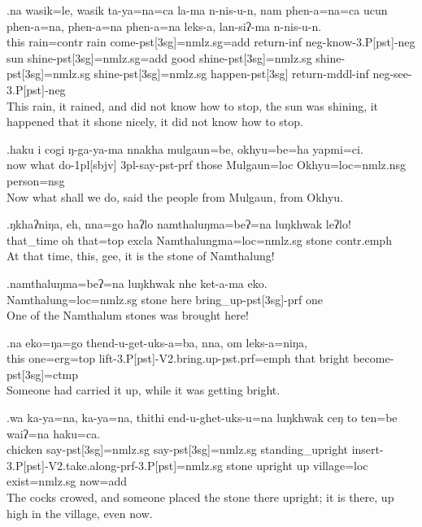 \exg.na wasik=le,  wasik ta-ya=na=ca   la-ma  n-nis-u-n, nam phen-a=na=ca   ucun phen-a=na,    phen-a=na    phen-a=na    leks-a, lan-siʔ-ma    n-nis-u-n.\\
this rain{\sc =contr} rain  come{\sc -pst[3sg]=nmlz.sg=add} return{\sc -inf} {\sc neg-}know{\sc -3.P[pst]-neg} sun shine{\sc -pst[3sg]=nmlz.sg=add} good shine{\sc -pst[3sg]=nmlz.sg} shine{\sc -pst[3sg]=nmlz.sg} shine{\sc -pst[3sg]=nmlz.sg} happen{\sc -pst[3sg]} return{\sc -mddl-inf} {\sc neg-}see{\sc -3.P[pst]-neg}\\
This rain, it rained, and did not know how to stop,  the sun was shining, it happened that it shone nicely,  it did not know how to stop.


\exg.haku i  cogi  ŋ-ga-ya-ma   nnakha mulgaun=be, okhyu=be=ha  yapmi=ci.\\
now  what do{\sc -1pl[sbjv]} {\sc 3pl-}say{\sc -pst-prf} those  Mulgaun{\sc =loc} Okhyu{\sc =loc=nmlz.nsg} person{\sc =nsg}\\
Now what shall we do, said the people from Mulgaun, from Okhyu.

\exg.ŋkhaʔniŋa, eh,  nna=go  haʔlo namthaluŋma=beʔ=na  luŋkhwak leʔlo!\\
that\_time oh that{\sc =top} excla  Namthalungma{\sc =loc=nmlz.sg} stone {\sc contr.emph}\\
At that time, this, gee, it is the stone of Namthalung!

\exg.namthaluŋma=beʔ=na  luŋkhwak nhe  ket-a-ma    eko.\\
Namthalung{\sc =loc=nmlz.sg} stone here bring\_up{\sc -pst[3sg]-prf} one\\
One of the Namthalum stones was brought here!

\exg.na eko=ŋa=go thend-u-get-uks-a=ba,   nna, om leks-a=niŋa,\\
this one{\sc =erg=top}  lift{\sc -3.P[pst]-V2.bring.up-pst.prf=emph} that bright become{\sc -pst[3sg]=ctmp}\\
Someone had carried it up, while it was getting bright.

\exg.wa  ka-ya=na,  ka-ya=na,  thithi end-u-ghet-uks-u=na      luŋkhwak ceŋ  to  ten=be  waiʔ=na   haku=ca.\\
chicken say{\sc -pst[3sg]=nmlz.sg} say{\sc -pst[3sg]=nmlz.sg} standing\_upright insert{\sc -3.P[pst]-V2.take.along-prf-3.P[pst]=nmlz.sg} stone upright up  village{\sc =loc} exist{\sc [3sg]=nmlz.sg} now={\sc add}\\
The cocks crowed, and someone placed the stone there upright; it is there, up high in the village, even now.

